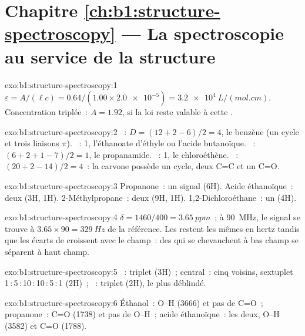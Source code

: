 \section*{Chapitre \ref{ch:b1:structure-spectroscopy} --- La spectroscopie au service de la structure}

\begin{solution}{exo:b1:structure-spectroscopy:1}
$\varepsilon = A/(\ell c) = 0.64/(1.00 \times \num{2.0e-5}) =
\qty{3.2e4}{L/(mol.cm)}$. Concentration triplée~: $A = 1.92$, si la loi
reste valable à cette .
\end{solution}

\begin{solution}{exo:b1:structure-spectroscopy:2}
~: $D = (12 + 2 - 6)/2 = 4$, le benzène (un cycle et trois
liaisons $\pi$). ~: 1, l'éthanoate d'éthyle ou l'acide
butanoïque. ~: $(6 + 2 + 1
- 7)/2 = 1$, le propanamide. ~: 1, le chloroéthène.
~:
$(20 + 2 - 14)/2 = 4$~: la carvone possède un cycle, deux C=C et un C=O.
\end{solution}

\begin{solution}{exo:b1:structure-spectroscopy:3}
Propanone~: un signal (6H). Acide éthanoïque~: deux (3H, 1H).
2-Méthylpropane~: deux (9H, 1H). 1,2-Dichloroéthane~: un (4H).
\end{solution}

\begin{solution}{exo:b1:structure-spectroscopy:4}
$\delta = 1460/400 = \qty{3.65}{ppm}$~; à \qty{90}{MHz}, le signal se
trouve à $3.65 \times 90 = \qty{329}{Hz}$ de la référence. Les
 restent les mêmes en hertz tandis que les écarts
de  croissent avec le champ~: des  qui se
chevauchent à bas champ se séparent à haut champ.
\end{solution}

\begin{solution}{exo:b1:structure-spectroscopy:5}
~: triplet (3H)~;  central~: cinq voisins, sextuplet
1\,:\,5\,:\,10\,:\,10\,:\,5\,:\,1 (2H)~; ~: triplet (2H), le
plus déblindé.
\end{solution}

\begin{solution}{exo:b1:structure-spectroscopy:6}
Éthanol~: O--H (3666) et pas de C=O~; propanone~: C=O (1738) et pas de
O--H~; acide éthanoïque~: les deux, O--H (3582) et C=O (1788).
\end{solution}

